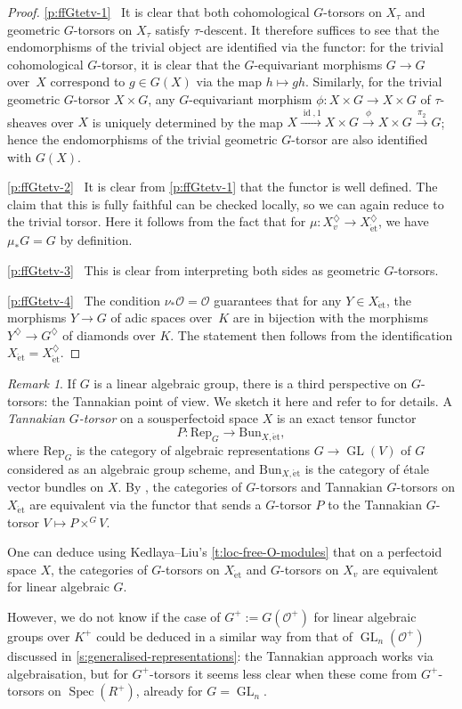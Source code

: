 \documentclass[11pt]{amsart}
\numberwithin{equation}{section}
\theoremstyle{definition}
\theoremstyle{remark}
\newtheorem{Remark}[thm]{Remark}
\newcommand{\lra}{\longrightarrow}
\renewcommand{\O}{\mathcal{O}}
\newcommand{\GL}{\operatorname{GL}}
\newcommand{\Spec}{\operatorname{Spec}}
\newcommand{\id}{{\operatorname{id}}}
\newcommand{\et}{{\operatorname{\acute{e}t}}}
\newcommand{\Rep}{\mathrm{Rep}}
\begin{document}
\begin{proof}
  \eqref{p:ffGtetv-1}~ It is clear that both cohomological $G$-torsors on $X_{\tau}$ and geometric $G$-torsors  on $X_{\tau}$ satisfy $\tau$-descent. It therefore suffices to see  that the endomorphisms of the trivial object are identified via the functor: for the trivial cohomological $G$-torsor, it is clear that the $G$-equivariant morphisms $G\to G$ over~$X$ correspond to $g\in G(X)$ via the map $h\mapsto gh$. Similarly, for the trivial geometric $G$-torsor $X\times G$, any $G$-equivariant morphism $\phi\colon X\times G\to X\times G$ of $\tau$-sheaves over $X$ is uniquely determined by the map $X\xrightarrow{\id,1}X\times G\xrightarrow{\phi} X\times G\xrightarrow{\pi_2} G$; hence the endomorphisms of the trivial geometric $G$-torsor are also identified with $G(X)$.
  
\eqref{p:ffGtetv-2}~  It is clear from \eqref{p:ffGtetv-1} that the functor is well defined. The claim that this is fully faithful can be checked locally, so we can again reduce to the trivial torsor. Here it follows from the fact that for $\mu\colon X_v^\diamondsuit\to  X_\et^{\diamondsuit}$, we have $\mu_{\ast}G=G$ by definition.

\eqref{p:ffGtetv-3}~ This is clear from interpreting both sides as geometric $G$-torsors.

\eqref{p:ffGtetv-4}~ The condition $\nu_{\ast}\O=\O$ guarantees that for any $Y\in X_\et$, the morphisms $Y\to G$ of adic spaces over~$K$ are in bijection with the morphisms $Y^\diamondsuit\to G^\diamondsuit$ of diamonds over $K$. The statement then follows from the identification $X_\et=X_\et^\diamondsuit$.
\end{proof}

\begin{Remark}
	If $G$ is a linear algebraic group, there is a third perspective on $G$-torsors: the Tannakian point of view. We sketch it here and refer to \cite[Appendix to Lecture 19]{ScholzeBerkeleyLectureNotes} for details. A \emph{Tannakian $G$-torsor} on a sousperfectoid space $X$ is an exact tensor functor 
	\[P\colon\Rep_G\lra \mathrm{Bun}_{X,\et},\]
	 where $\Rep_G$ is the category of algebraic representations $G\to \GL(V)$ of $G$ considered as an algebraic group scheme, and $\mathrm{Bun}_{X,\et}$ is the category of \'etale vector bundles on $X$. By \cite[Theorem 19.5.1]{ScholzeBerkeleyLectureNotes}, the categories of $G$-torsors  and Tannakian $G$-torsors on $X_{\et}$ are equivalent via the functor that sends a $G$-torsor $P$ to the Tannakian $G$-torsor  $V\mapsto P\times^GV$.
	 
	 One can deduce using Kedlaya--Liu's \cref{t:loc-free-O-modules} that on a perfectoid space $X$, the categories of $G$-torsors on $X_{\et}$ and $G$-torsors on $X_{v}$ are equivalent for linear algebraic $G$.
	 
	 However, we do not know if the case of $G^+:=G(\O^+)$ for linear algebraic groups over $K^+$ could be deduced in a similar way from that of $\GL_n(\O^+)$ discussed in \cref{s:generalised-representations}:  the Tannakian approach works via algebraisation, but for $G^+$-torsors it seems less clear when these come from $G^+$-torsors on $\Spec(R^+)$, already for $G=\GL_n$.
\end{Remark}
\end{document}
